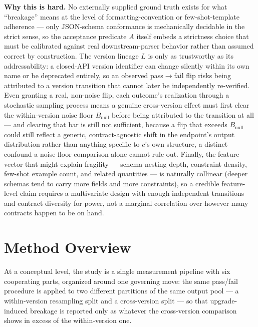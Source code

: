 \documentclass[11pt]{article}
\begin{document}
\noindent\textbf{Why this is hard.} No externally supplied ground truth exists for what ``breakage'' means at the level of formatting-convention or few-shot-template adherence --- only JSON-schema conformance is mechanically decidable in the strict sense, so the acceptance predicate $A$ itself embeds a strictness choice that must be calibrated against real downstream-parser behavior rather than assumed correct by construction. The version lineage $L$ is only as trustworthy as its addressability: a closed-API version identifier can change silently within its own name or be deprecated entirely, so an observed pass$\to$fail flip risks being attributed to a version transition that cannot later be independently re-verified. Even granting a real, non-noise flip, each outcome's realization through a stochastic sampling process means a genuine cross-version effect must first clear the within-version noise floor $B_{\text{null}}$ before being attributed to the transition at all --- and clearing that bar is still not sufficient, because a flip that exceeds $B_{\text{null}}$ could still reflect a generic, contract-agnostic shift in the endpoint's output distribution rather than anything specific to $c$'s own structure, a distinct confound a noise-floor comparison alone cannot rule out. Finally, the feature vector that might explain fragility --- schema nesting depth, constraint density, few-shot example count, and related quantities --- is naturally collinear (deeper schemas tend to carry more fields and more constraints), so a credible feature-level claim requires a multivariate design with enough independent transitions and contract diversity for power, not a marginal correlation over however many contracts happen to be on hand.

\section{Method Overview}

At a conceptual level, the study is a single measurement pipeline with six cooperating parts, organized around one governing move: the same pass/fail procedure is applied to two different partitions of the same output pool --- a within-version resampling split and a cross-version split --- so that upgrade-induced breakage is reported only as whatever the cross-version comparison shows in excess of the within-version one.
\end{document}
